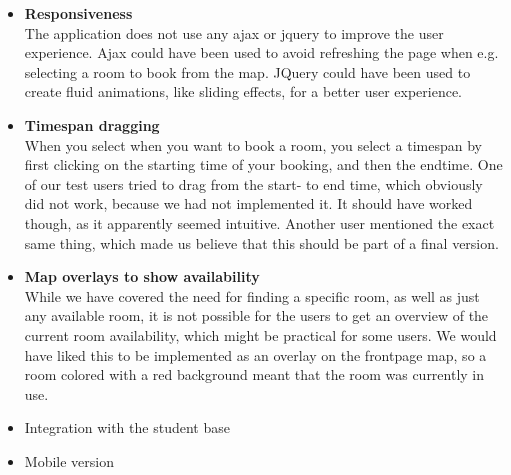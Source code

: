 \begin{itemize}
	\item \textbf{Responsiveness}\\
	The application does not use any ajax or jquery to improve the user experience. Ajax could have been used to avoid refreshing the page when e.g. selecting a room to book from the map. JQuery could have been used to create fluid animations, like sliding effects, for a better user experience. 
	
	\item \textbf{Timespan dragging}\\
	When you select when you want to book a room, you select a timespan by first clicking on the starting time of your booking, and then the endtime. One of our test users tried to drag from the start- to end time, which obviously did not work, because we had not implemented it. It should have worked though, as it apparently seemed intuitive. Another user mentioned the exact same thing, which made us believe that this should be part of a final version.
	
	\item \textbf{Map overlays to show availability}\\
	While we have covered the need for finding a specific room, as well as just any available room, it is not possible for the users to get an overview of the current room availability, which might be practical for some users. We would have liked this to be implemented as an overlay on the frontpage map, so a room colored with a red background meant that the room was currently in use.
	\item Integration with the student base
	\item Mobile version
\end{itemize}
